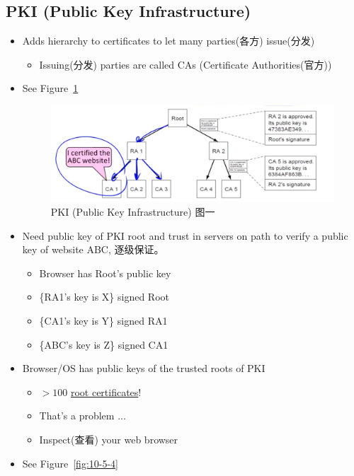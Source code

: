 \documentclass[12pt]{ctexart}   %
\begin{document}
	\subsection{PKI (Public Key Infrastructure)}
	\begin{itemize}
		\item Adds hierarchy to certificates to let many parties(各方) issue(分发)
		\begin{itemize}
			\item Issuing(分发) parties are called CAs (Certificate Authorities(官方))
		\end{itemize}
		\item See Figure~\ref{fig:10-5-3}
		  
		\begin{figure}[h!] %
		\centering
		\includegraphics[scale=0.7]{images/10-5-3}
		\caption{PKI (Public Key Infrastructure) 图一}
		\label{fig:10-5-3}
		\end{figure}

		\item Need public key of PKI root and trust in servers on path to verify a public key of website ABC, 逐级保证。
		\begin{itemize}
			\item Browser has Root's public key
			\item \{RA1's key is X\} signed Root
			\item \{CA1's key is Y\} signed RA1
			\item \{ABC's key is Z\} signed CA1
		\end{itemize}

		\item Browser/OS has public keys of the trusted roots of PKI
		\begin{itemize}
			\item $> 100$ \underline{root certificates}!
			\item That's a problem ... 
			\item Inspect(查看) your web browser
		\end{itemize}
		\item See Figure~\ref{fig:10-5-4}
		  

\end{itemize}
\end{document}
